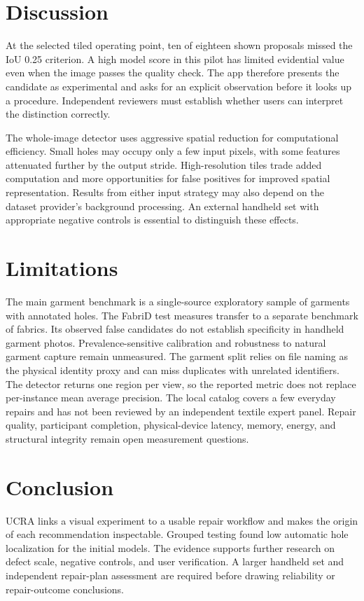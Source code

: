 \section{Discussion}

At the selected tiled operating point, ten of eighteen shown proposals missed the IoU 0.25 criterion. A high model score in this pilot has limited evidential value even when the image passes the quality check. The app therefore presents the candidate as experimental and asks for an explicit observation before it looks up a procedure. Independent reviewers must establish whether users can interpret the distinction correctly.

The whole-image detector uses aggressive spatial reduction for computational efficiency. Small holes may occupy only a few input pixels, with some features attenuated further by the output stride. High-resolution tiles trade added computation and more opportunities for false positives for improved spatial representation. Results from either input strategy may also depend on the dataset provider's background processing. An external handheld set with appropriate negative controls is essential to distinguish these effects.

\section{Limitations}

The main garment benchmark is a single-source exploratory sample of garments with annotated holes. The FabriD test measures transfer to a separate benchmark of fabrics. Its observed false candidates do not establish specificity in handheld garment photos. Prevalence-sensitive calibration and robustness to natural garment capture remain unmeasured. The garment split relies on file naming as the physical identity proxy and can miss duplicates with unrelated identifiers. The detector returns one region per view, so the reported metric does not replace per-instance mean average precision. The local catalog covers a few everyday repairs and has not been reviewed by an independent textile expert panel. Repair quality, participant completion, physical-device latency, memory, energy, and structural integrity remain open measurement questions.

\section{Conclusion}

UCRA links a visual experiment to a usable repair workflow and makes the origin of each recommendation inspectable. Grouped testing found low automatic hole localization for the initial models. The evidence supports further research on defect scale, negative controls, and user verification. A larger handheld set and independent repair-plan assessment are required before drawing reliability or repair-outcome conclusions.

